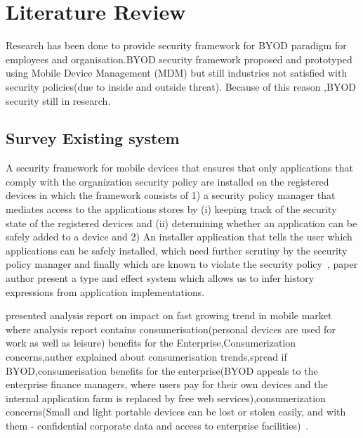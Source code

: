\graphicspath{ {images/} }
\chapter{Literature Review}
\hspace{5mm} Research has been done to provide security framework for BYOD paradigm for employees and organisation.BYOD security framework proposed and prototyped using Mobile Device Management (MDM) but still industries not satisfied with security policies(due  to inside and outside threat).
Because of this reason ,BYOD security still in research.

\section{Survey Existing system} 
A security framework for mobile devices that ensures that only applications that comply with the organization security policy are installed on the registered devices in which the framework consists of 1) a security policy manager that mediates access to the applications stores by (i) keeping track of the security state of the registered devices and (ii) determining whether an application can be safely added to a device and
2) An installer application that tells the user which applications can be safely installed, which need further scrutiny by the security policy manager and finally which are known to violate the security policy~\cite{aless,sean}, paper author present a type and effect system which allows us to infer history expressions from application implementations.

\par presented analysis report on impact on fast growing trend in mobile market where analysis report contains consumerisation(personal devices are used for work as well as leisure) benefits for the Enterprise,Consumerization concerns,auther explained about consumerisation trends,spread if BYOD,consumerisation benefits for the enterprise(BYOD appeals to the enterprise finance managers, where users pay for their own devices and the internal application farm is replaced by free web services),consumerization concerns(Small and light portable devices can be lost or stolen easily, and with them - confidential corporate data and access to enterprise facilities)~\cite{ben}.

